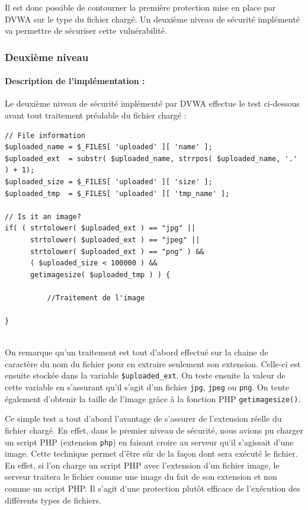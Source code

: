 Il est donc possible de contourner la première protection mise en place par DVWA sur le type du fichier chargé. Un deuxième niveau de sécurité implémenté va permettre de sécuriser cette vulnérabilité.


\subsubsection{Deuxième niveau}

\paragraph{Description de l'implémentation :}

Le deuxième niveau de sécurité implémenté par DVWA effectue le test ci-dessous avant tout traitement préalable du fichier chargé :


\begin{lstlisting}
// File information
$uploaded_name = $_FILES[ 'uploaded' ][ 'name' ];
$uploaded_ext  = substr( $uploaded_name, strrpos( $uploaded_name, '.' ) + 1);
$uploaded_size = $_FILES[ 'uploaded' ][ 'size' ];
$uploaded_tmp  = $_FILES[ 'uploaded' ][ 'tmp_name' ];

// Is it an image?
if( ( strtolower( $uploaded_ext ) == "jpg" ||
      strtolower( $uploaded_ext ) == "jpeg" || 
      strtolower( $uploaded_ext ) == "png" ) && 
      ( $uploaded_size < 100000 ) &&
      getimagesize( $uploaded_tmp ) ) {
      
          //Traitement de l'image

}
        
\end{lstlisting}

On remarque qu'un traitement est tout d'abord effectué sur la chaine de caractère du nom du fichier pour en extraire seulement son extension. Celle-ci est ensuite stockée dans la variable \texttt{\$uploaded\_ext}. On teste ensuite la valeur de cette variable en s'assurant qu'il s'agit d'un fichier \texttt{jpg}, \texttt{jpeg} ou \texttt{png}. On tente également d'obtenir la taille de l'image grâce à la fonction PHP \texttt{getimagesize()}.

Ce simple test a tout d'abord l'avantage de s'assurer de l'extension réelle du fichier chargé. En effet, dans le premier niveau de sécurité, nous avions pu charger un script PHP (extension \texttt{php}) en faisant croire au serveur qu'il s'agissait d'une image. Cette technique permet d'être sûr de la façon dont sera exécuté le fichier. En effet, si l'on charge un script PHP avec l'extension d'un fichier image, le serveur traitera le fichier comme une image du fait de son extension et non comme un script PHP. Il s'agit d'une protection plutôt efficace de l'exécution des différents types de fichiers.

